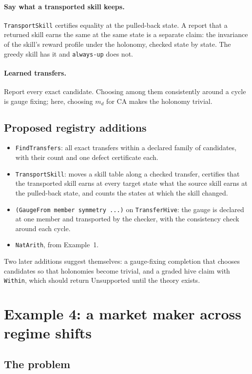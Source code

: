 \documentclass[11pt]{article}
\newcommand{\code}[1]{\texttt{#1}}
\theoremstyle{definition}
\theoremstyle{plain}
\begin{document}
\paragraph{Say what a transported skill keeps.} \code{TransportSkill} certifies equality at the
pulled-back state. A report that a returned skill earns the same at the same state is a separate
claim: the invariance of the skill's reward profile under the holonomy, checked state by state. The
greedy skill has it and \code{always-up} does not.

\paragraph{Learned transfers.} Report every exact candidate. Choosing among them consistently around a
cycle is gauge fixing; here, choosing $m_d$ for CA makes the holonomy trivial.

\subsection{Proposed registry additions}

\begin{itemize}
\item \code{FindTransfers}: all exact transfers within a declared family of candidates, with their
count and one defect certificate each.
\item \code{TransportSkill}: moves a skill table along a checked transfer, certifies that the
transported skill earns at every target state what the source skill earns at the pulled-back state,
and counts the states at which the skill changed.
\item \code{(GaugeFrom member symmetry ...)} on \code{TransferHive}: the gauge is declared at one
member and transported by the checker, with the consistency check around each cycle.
\item \code{NatArith}, from Example~1.
\end{itemize}
Two later additions suggest themselves: a gauge-fixing completion that chooses candidates so that
holonomies become trivial, and a graded hive claim with \code{Within}, which should return
Unsupported until the theory exists.
\section{Example 4: a market maker across regime shifts}\label{sec:ex4}

\subsection{The problem}
\end{document}
